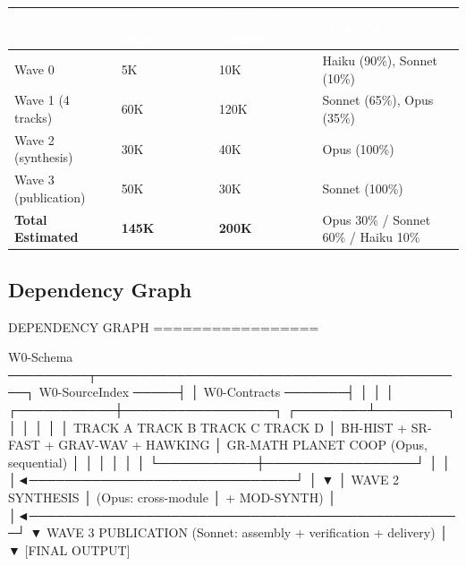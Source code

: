 \documentclass[11pt,letterpaper]{article}
\newcommand{\tableheader}[1]{\textbf{\sffamily\textcolor{white}{#1}}}
\begin{document}
\begin{center}
\begin{tabularx}{\textwidth}{L{3cm}C{2.5cm}C{2.5cm}C{3cm}}
\toprule
{}
\tableheader{Wave} & \tableheader{Estimated Input} & \tableheader{Estimated Output} & \tableheader{Model Mix} \\
\midrule
Wave 0 & 5K & 10K & Haiku (90\%), Sonnet (10\%) \\
Wave 1 (4 tracks) & 60K & 120K & Sonnet (65\%), Opus (35\%) \\
Wave 2 (synthesis) & 30K & 40K & Opus (100\%) \\
Wave 3 (publication) & 50K & 30K & Sonnet (100\%) \\
\midrule
\textbf{Total Estimated} & \textbf{145K} & \textbf{200K} & Opus 30\% / Sonnet 60\% / Haiku 10\% \\
\bottomrule
\end{tabularx}
\end{center}

\subsection{Dependency Graph}

\begin{asciibox}
DEPENDENCY GRAPH
=================

W0-Schema ─────────┬──────────────────────────────────────────┐
W0-SourceIndex ─────┤                                          │
W0-Contracts ───────┤                                          │
                    │                                          │
        ┌───────────┼─────────────────┐              ┌────────┴────────┐
        │           │                 │              │                 │
   TRACK A      TRACK B          TRACK C          TRACK D             │
  BH-HIST +    SR-FAST +        GRAV-WAV +        HAWKING             │
  GR-MATH      PLANET           COOP         (Opus, sequential)       │
        │           │                 │              │                 │
        └───────────┼─────────────────┘              │                 │
                    │◄──────────────────────────────┘                 │
                    ▼                                                  │
              WAVE 2 SYNTHESIS                                         │
              (Opus: cross-module                                      │
               + MOD-SYNTH)                                            │
                    │◄─────────────────────────────────────────────────┘
                    ▼
              WAVE 3 PUBLICATION
              (Sonnet: assembly +
               verification + delivery)
                    │
                    ▼
             [FINAL OUTPUT]
\end{asciibox}
\end{document}
